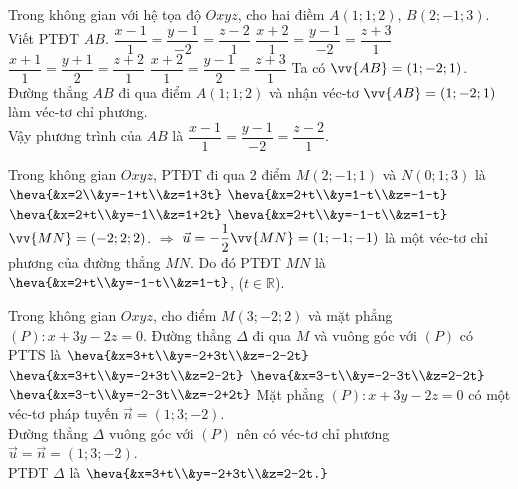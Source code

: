\begin{ex}%
	Trong không gian với hệ tọa độ $O x y z$, cho hai điềm $A(1;1;2)$, $B(2;-1;3)$. Viết PTĐT $AB$.
	\choice 
	{\True $\dfrac{x-1}{1}=\dfrac{y-1}{-2}=\dfrac{z-2}{1}$}
	{$\dfrac{x+2}{1}=\dfrac{y-1}{-2}=\dfrac{z+3}{1}$}
	{$\dfrac{x+1}{1}=\dfrac{y+1}{2}=\dfrac{z+2}{1}$}
	{$\dfrac{x+2}{1}=\dfrac{y-1}{2}=\dfrac{z+3}{1}$}
	\loigiai 
	{
Ta có $\vv{AB}=(1;-2;1)$.\\
Đường thẳng $AB$ đi qua điểm $A(1;1;2)$ và nhận véc-tơ $\vv{AB}=(1;-2;1)$ làm véc-tơ chỉ phương.\\
Vậy phương trình của $AB$ là $\dfrac{x-1}{1}=\dfrac{y-1}{-2}=\dfrac{z-2}{1}$.
	}
\end{ex}

\begin{ex}%
Trong không gian $O x y z$, PTĐT đi qua 2 điểm $M(2;-1;1)$ và $N(0;1;3)$ là 
\choice 
{$\heva{&x=2\\&y=-1+t\\&z=1+3t}$}
{$\heva{&x=2+t\\&y=1-t\\&z=-1-t}$}
{$\heva{&x=2+t\\&y=-1\\&z=1+2t}$}
{\True $\heva{&x=2+t\\&y=-1-t\\&z=1-t}$}
\loigiai
{
$\vv{M N}=(-2;2;2)$.
$\Rightarrow$ $\vec{u}=-\dfrac{1}{2}\vv{MN}=(1;-1;-1)$ là một véc-tơ chỉ phương của đường thẳng $MN$. Do đó PTĐT $MN$ là $\heva{&x=2+t\\&y=-1-t\\&z=1-t}$, ($t\in\mathbb{R}$).
}
\end{ex}

\begin{ex}%
	Trong không gian $O x y z$, cho điểm $M(3;-2;2)$ và mặt phẳng $(P): x+3y-2z=0$. Đường thẳng $\Delta$ đi qua $M$ và vuông góc với $(P)$ có PTTS là 
	\choice 
	{$\heva{&x=3+t\\&y=-2+3t\\&z=-2-2t}$}
	{\True $\heva{&x=3+t\\&y=-2+3t\\&z=2-2t}$}
	{$\heva{&x=3-t\\&y=-2-3t\\&z=2-2t}$}
	{$\heva{&x=3-t\\&y=-2-3t\\&z=-2+2t}$}
					\loigiai 
					{
Mặt phẳng $(P)\colon x+3y-2z=0$ có một véc-tơ pháp tuyến $\vec{n}=(1;3;-2)$.\\
Đường thẳng $\Delta$ vuông góc với $(P)$ nên có véc-tơ chỉ phương $\vec{u}=\vec{n}=(1;3;-2)$.\\
PTĐT $\Delta$ là $\heva{&x=3+t\\&y=-2+3t\\&z=2-2t.}$	
					}
\end{ex}

